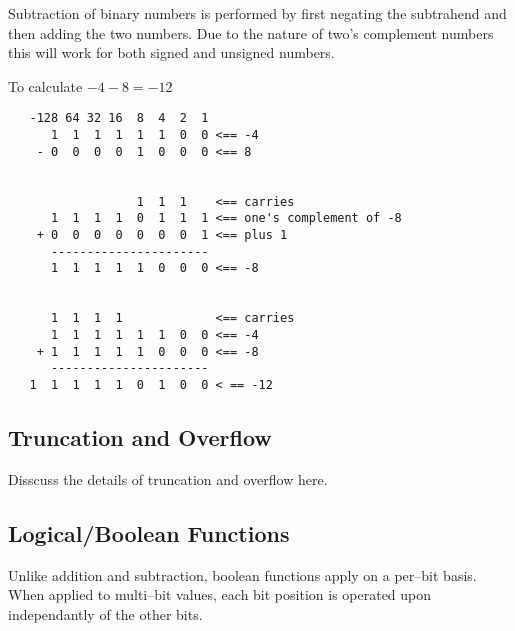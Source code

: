 Subtraction of binary numbers is performed by first negating
the subtrahend and then adding the two numbers.  Due to the
nature of two's complement numbers this will work for both 
signed and unsigned numbers.

To calculate $-4-8 = -12$

\begin{verbatim}
   -128 64 32 16  8  4  2  1
      1  1  1  1  1  1  0  0 <== -4
    - 0  0  0  0  1  0  0  0 <== 8


                  1  1  1    <== carries
      1  1  1  1  0  1  1  1 <== one's complement of -8
    + 0  0  0  0  0  0  0  1 <== plus 1
      ----------------------
      1  1  1  1  1  0  0  0 <== -8
      
	  
      1  1  1  1             <== carries
      1  1  1  1  1  1  0  0 <== -4
    + 1  1  1  1  1  0  0  0 <== -8
      ----------------------
   1  1  1  1  1  0  1  0  0 < == -12
\end{verbatim}


\subsection{Truncation and Overflow}

Disscuss the details of truncation and overflow here.

\subsection{Logical/Boolean Functions}

Unlike addition and subtraction, boolean functions apply 
on a per--bit basis.
When applied to multi--bit values, each bit position is operated upon 
independantly of the other bits.

